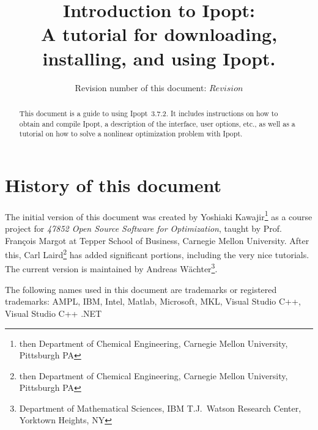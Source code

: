 \documentclass[10pt]{article}
\newcommand{\Ipopt}{{\sc Ipopt}}
\begin{document}
\title{Introduction to \Ipopt:\\
A tutorial for downloading, installing, and using \Ipopt.}

\author{Revision number of this document: $Revision$}

\maketitle

\begin{abstract}
  This document is a guide to using \Ipopt\ 3.7.2.  It includes
  instructions on how to obtain and compile \Ipopt, a description of
  the interface, user options, etc., as well as a tutorial on how to
  solve a nonlinear optimization problem with \Ipopt.
\end{abstract}

\section*{History of this document}
The initial version of this document was created by Yoshiaki
Kawajir\footnote{then Department of Chemical Engineering, Carnegie Mellon
  University, Pittsburgh PA} as a course project for \textit{47852
  Open Source Software for Optimization}, taught by Prof. Fran\c cois
Margot at Tepper School of Business, Carnegie Mellon University.
After this, Carl Laird\footnote{then Department of Chemical
  Engineering, Carnegie Mellon University, Pittsburgh PA} has added
significant portions, including the very nice tutorials.  The current
version is maintained by Andreas W\"achter\footnote{Department of
  Mathematical Sciences, IBM T.J.\ Watson Research Center, Yorktown
  Heights, NY}.

\tableofcontents

\vspace{\baselineskip}
\begin{small}
\noindent
The following names used in this document are trademarks or registered
trademarks: AMPL, IBM, Intel, Matlab, Microsoft, MKL, Visual Studio C++,
Visual Studio C++ .NET
\end{small}
\end{document}
